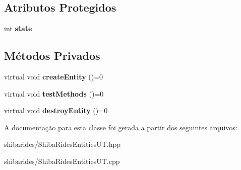 \subsection*{Atributos Protegidos}
\begin{DoxyCompactItemize}
\item 
int {\bfseries state}\hypertarget{classshibarides_1_1TUEntidade_ae97a7aafba3d0ff02733c49e4471a777}{}\label{classshibarides_1_1TUEntidade_ae97a7aafba3d0ff02733c49e4471a777}

\end{DoxyCompactItemize}
\subsection*{Métodos Privados}
\begin{DoxyCompactItemize}
\item 
virtual void {\bfseries create\+Entity} ()=0\hypertarget{classshibarides_1_1TUEntidade_a240d170e81ddaacf9ebc7735da43d727}{}\label{classshibarides_1_1TUEntidade_a240d170e81ddaacf9ebc7735da43d727}

\item 
virtual void {\bfseries test\+Methods} ()=0\hypertarget{classshibarides_1_1TUEntidade_a6f04c7f529e266a8590a93e8efd53b2f}{}\label{classshibarides_1_1TUEntidade_a6f04c7f529e266a8590a93e8efd53b2f}

\item 
virtual void {\bfseries destroy\+Entity} ()=0\hypertarget{classshibarides_1_1TUEntidade_abc20192c0caa09b83d7f23f21dcf8203}{}\label{classshibarides_1_1TUEntidade_abc20192c0caa09b83d7f23f21dcf8203}

\end{DoxyCompactItemize}


A documentação para esta classe foi gerada a partir dos seguintes arquivos\+:\begin{DoxyCompactItemize}
\item 
shibarides/Shiba\+Rides\+Entities\+U\+T.\+hpp\item 
shibarides/Shiba\+Rides\+Entities\+U\+T.\+cpp\end{DoxyCompactItemize}
